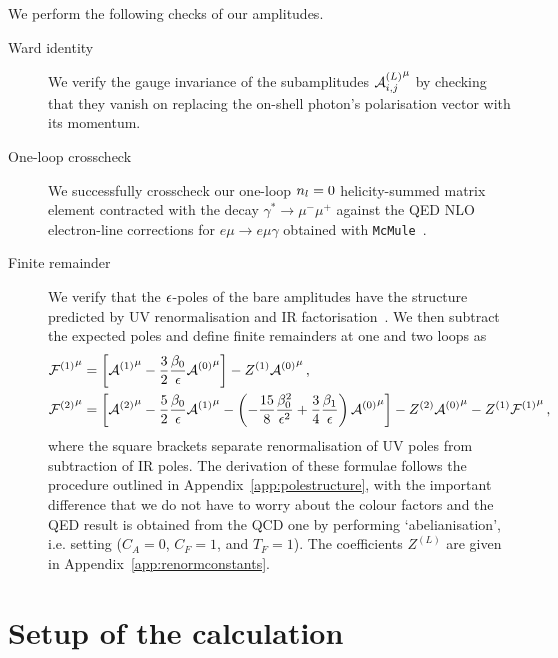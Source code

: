 \documentclass[main.tex]{subfiles}
\begin{document}
\smallskip

We perform the following checks of our amplitudes.
\begin{description}
    \item[Ward identity]
        We verify the gauge invariance of the subamplitudes ${\mathcal{A}^{(L)}_{i, j}}^{\mu}$ by checking that they vanish on replacing the on-shell photon's polarisation vector with its momentum.

    \item[One-loop crosscheck]
        We successfully crosscheck our one-loop $n_l=0$ helicity-summed matrix element contracted with the decay $\gamma^*\to\mu^-\mu^+$ against the \ac{QED} \ac{NLO} electron-line corrections for $e\mu\to e\mu\gamma$ obtained with \texttt{McMule}~\cite{Banerjee:2020rww,ulrich_yannick_2022_6046769}.

    \item[Finite remainder]
      We verify that the $\epsilon$-poles of the bare amplitudes have the structure predicted by \ac{UV} renormalisation and \ac{IR} factorisation~\cite{Catani:1998bh,Gardi:2009qi,Gardi:2009zv,Becher:2009cu,Becher:2009qa}. We then subtract the expected poles and define finite remainders at one and two loops as
        \begin{subequations}
            \label{eqQED:finite-remainders}
            \begin{align}
                {\mathcal{F}^{(1)}}^\mu &= \left[ {\mathcal{A}^{(1)}}^{\mu} - \frac{3}{2}\frac{\beta_0}{\epsilon} {\mathcal{A}^{(0)}}^{\mu} \right] - Z^{(1)} {\mathcal{A}^{(0)}}^{\mu} \,,\\
                {\mathcal{F}^{(2)}}^\mu &= \left[ {\mathcal{A}^{(2)}}^{\mu} - \frac{5}{2}\frac{\beta_0}{\epsilon} {\mathcal{A}^{(1)}}^{\mu} - \left(-\frac{15}{8}\frac{\beta_0^2}{\epsilon^2}+\frac{3}{4}\frac{\beta_1}{\epsilon}\right) {\mathcal{A}^{(0)}}^{\mu} \right] - Z^{(2)} {\mathcal{A}^{(0)}}^{\mu} - Z^{(1)} {\mathcal{F}^{(1)}}^\mu \,,
            \end{align}
        \end{subequations}
        where the square brackets separate renormalisation of \ac{UV} poles from subtraction of \ac{IR} poles. The derivation of these formulae follows the procedure outlined in Appendix~\ref{app:polestructure}, with the important difference that we do not have to worry about the colour factors and the QED result is obtained from the QCD one by performing `abelianisation', i.e. setting ($C_A=0$, $C_F=1$, and $T_F=1$). The coefficients $Z^{(L)}$ are given in Appendix~\ref{app:renormconstants}.
\end{description}

\section{Setup of the calculation}
\label{secQED:calc}
\end{document}

